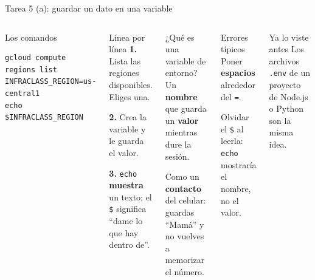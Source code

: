 \documentclass[aspectratio=169,10pt,c]{beamer}
\begin{document}
\begin{frame}[fragile]{Tarea 5 (a): guardar un dato en una variable}
\begin{columns}[T,onlytextwidth]
\begin{block}{Los comandos}
\begin{lstlisting}[basicstyle=\ttfamily\footnotesize]
gcloud compute regions list
INFRACLASS_REGION=us-central1
echo $INFRACLASS_REGION
\end{lstlisting}
\end{block}
\begin{block}{Línea por línea}
\small
\textbf{1.} Lista las regiones disponibles. Eliges una.\par\smallskip
\textbf{2.} Crea la variable y le guarda el valor.\par\smallskip
\textbf{3.} \texttt{echo} \textbf{muestra} un texto; el \texttt{\$} significa ``dame lo que hay dentro de''.
\end{block}
\begin{exampleblock}{¿Qué es una variable de entorno?}
\small Un \textbf{nombre} que guarda un \textbf{valor} mientras dure la sesión.\par\smallskip
Como un \textbf{contacto} del celular: guardas ``Mamá'' y no vuelves a memorizar el número.
\end{exampleblock}
\begin{alertblock}{Errores típicos}
\small Poner \textbf{espacios} alrededor del \texttt{=}.\par
Olvidar el \texttt{\$} al leerla: \texttt{echo} mostraría el nombre, no el valor.
\end{alertblock}
\begin{block}{Ya lo viste antes}
\footnotesize Los archivos \texttt{.env} de un proyecto de Node.js o Python son la misma idea.
\end{block}
\end{columns}
\end{frame}
\end{document}

